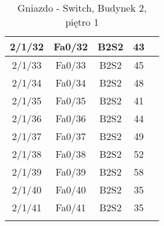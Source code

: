 \begin{center}
\begin{longtable}{|c|c|c|c|c|}
	2/1/32 & Fa0/32 & B2S2 & 43 \\ \hline
	2/1/33 & Fa0/33 & B2S2 & 45 \\ \hline
	2/1/34 & Fa0/34 & B2S2 & 48 \\ \hline
	2/1/35 & Fa0/35 & B2S2 & 41 \\ \hline
	2/1/36 & Fa0/36 & B2S2 & 44 \\ \hline
	2/1/37 & Fa0/37 & B2S2 & 49 \\ \hline
	2/1/38 & Fa0/38 & B2S2 & 52 \\ \hline
	2/1/39 & Fa0/39 & B2S2 & 58 \\ \hline
	2/1/40 & Fa0/40 & B2S2 & 35 \\ \hline
	2/1/41 & Fa0/41 & B2S2 & 35 \\ \hline
	\caption{Gniazdo - Switch, Budynek 2, piętro 1}\\
    \end{longtable}
\end{center}

